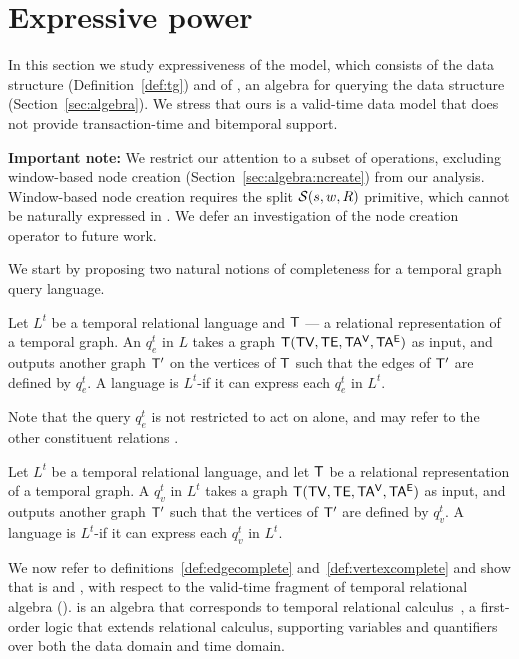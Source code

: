 \section{Expressive power}
\label{sec:formal}

In this section we study expressiveness of the \tg model, which
consists of the \tg data structure (Definition~\ref{def:tg}) and of
\tga, an algebra for querying the data structure
(Section~\ref{sec:algebra}). We stress that ours is a valid-time data
model that does not provide transaction-time and bitemporal support.

{\bf Important note:} We restrict our attention to a subset of \tga
operations, excluding window-based node creation
(Section~\ref{sec:algebra:ncreate}) from our analysis.  Window-based
node creation requires the split $\mathcal{S}(s,w,R)$ primitive, which
cannot be naturally expressed in \tra.  We defer an investigation of
the node creation operator to future work.

We start by proposing two natural notions of completeness for a
temporal graph query language.

\begin{definition}
  Let $L^t$ be a temporal relational language and $\mathsf{T}$ --- a
  relational representation of a temporal graph.  An \edgeq $q^t_e$ in
  $L$ takes a graph $\mathsf{T} (\textsf{TV}, \textsf{TE}, \mathsf{TA^{V}}, \mathsf{TA^{E}})$ as input, and
  outputs another graph $\mathsf{T}'$ on the vertices of $\mathsf{T}$ such that
  the edges of $\mathsf{T}'$ are defined by $q^t_e$.  A language is
  $L^t$-\edgec if it can express each $q^t_e$ in $L^t$.
  \label{def:edgecomplete}
\end{definition}

Note that the query $q^t_e$ is not restricted to act on \te alone, and
may refer to the other constituent relations \tve.

\begin{definition}
  Let $L^t$ be a temporal relational language, and let $\mathsf{T}$ be a
  relational representation of a temporal graph.  A \vertexq $q^t_v$
  in $L^t$ takes a graph $\mathsf{T} (\textsf{TV}, \textsf{TE}, \mathsf{TA^{V}}, \mathsf{TA^{E}})$ as input, and
  outputs another graph $\mathsf{T}'$ such that the vertices of $\mathsf{T}'$ are
  defined by $q^t_v$. A language is $L^t$-\vertexc if it can express
  each $q^t_v$ in $L^t$.
\label{def:vertexcomplete}
\end{definition}

We now refer to definitions~\ref{def:edgecomplete}
and~\ref{def:vertexcomplete} and show that \tga is \edgec and
\vertexc, with respect to the valid-time fragment of temporal
relational algebra (\tra).  \tra is an algebra that corresponds to
temporal relational calculus~\cite{DBLP:reference/db/ChomickiT09b}, a
first-order logic that extends relational calculus, supporting
variables and quantifiers over both the data domain and time domain.

